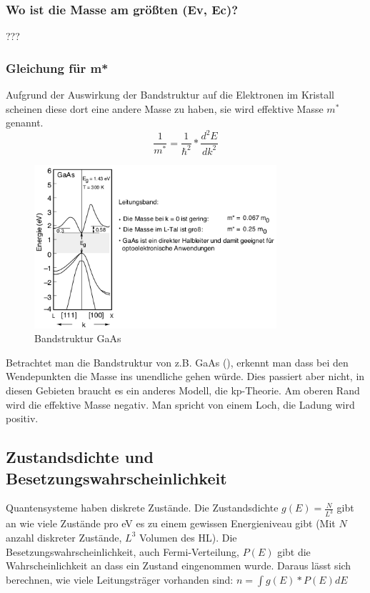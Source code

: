     \subsubsection{Wo ist die Masse am größten (Ev, Ec)?}
    ???
    \subsubsection{Gleichung für m*}
    Aufgrund der Auswirkung der Bandstruktur auf die Elektronen im Kristall scheinen diese dort eine andere Masse zu haben, sie wird
    effektive Masse $m^{*}$ genannt.
    \begin{equation}
        \frac{1}{m^{*}} = \frac{1}{\hbar^2}*\frac{d^2E}{dk^2}
    \end{equation}
    \begin{figure}
        \centering
        \includegraphics[width=0.8\textwidth]{fig/bandstrukturGaAs}
        \caption{Bandstruktur GaAs}
        \label{fig:bandGaAs}
    \end{figure}
    Betrachtet man die Bandstruktur von z.B. GaAs (), erkennt man dass bei den Wendepunkten die Masse ins unendliche
    gehen w\"urde. Dies passiert aber nicht, in diesen Gebieten braucht es ein anderes Modell, die kp-Theorie.
    Am oberen Rand wird die effektive Masse negativ. Man spricht von einem Loch, die Ladung wird positiv.

\subsection{Zustandsdichte und Besetzungswahrscheinlichkeit }\label{k4:zustandsDichte}
    Quantensysteme haben diskrete Zust\"ande.
    Die Zustandsdichte $g(E) = \frac{N}{L^3}$ gibt an wie viele Zust\"ande pro eV es zu einem gewissen Energieniveau gibt (Mit $N$ anzahl diskreter Zust\"ande, $L^3$ Volumen des HL).
    Die Besetzungswahrscheinlichkeit, auch Fermi-Verteilung, $P(E)$ gibt die Wahrscheinlichkeit an dass ein Zustand eingenommen wurde.
    Daraus l\"asst sich berechnen, wie viele Leitungstr\"ager vorhanden sind: $n = \int{g(E)*P(E) dE}$
    
